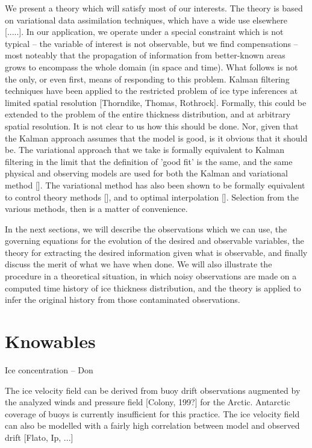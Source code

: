     We present a theory which will satisfy most of our interests.  The
theory is based on variational data assimilation techniques, which have
a wide use elsewhere [.....].  In our application, we operate under a 
special constraint which is not typical -- the variable of interest is
not observable, but we find compensations -- most noteably that the
propagation of information from better-known areas grows to encompass
the whole domain (in space and time).  What follows is not the only,
or even first, means of responding to this problem.  Kalman filtering
techniques have been applied to the restricted problem of ice type
inferences at limited spatial resolution [Thorndike, Thomas, Rothrock].  
Formally, this could be extended to the problem of the entire thickness
distribution, and at arbitrary spatial resolution.  It is not clear to
us how this should be done.  Nor, given that the Kalman approach assumes
that the model is good, is it obvious that it should be.  The variational
approach that we take is formally equivalent to Kalman filtering in the
limit that the definition of 'good fit' is the same, and the same physical
and observing models are used for both the Kalman and variational method [].
The variational method has also been shown to be formally equivalent to
control theory methods [], and to optimal interpolation [].  Selection from
the various methods, then is a matter of convenience.

    In the next sections, we will describe the observations which we can
use, the governing equations for the evolution of the desired and observable
variables, the theory for extracting the desired information given what is
observable, and finally discuss the merit of what we have when done.  We
will also illustrate the procedure in a theoretical situation, in which 
noisy observations are made on a computed time history of ice thickness 
distribution, and the theory is applied to infer the original history from
those contaminated observations.
\section{Knowables}

    Ice concentration -- Don

    The ice velocity field can be derived from buoy drift observations
augmented by the analyzed winds and pressure field [Colony, 199?] for
the Arctic.  Antarctic coverage of buoys is currently insufficient for
this practice.  The ice velocity field can also be modelled with a 
fairly high correlation between model and observed drift [Flato, Ip, ...]

